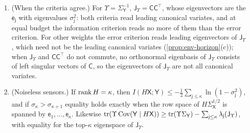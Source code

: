 \begin{theorem}
\begin{enumerate}
\item[(d)] (When the criteria agree.) For $\Upsilon=\Sigma_{\mathsf Y}^{-1}$, $\mathsf J_\Upsilon=\mathsf C\mathsf C^\top$, whose eigenvectors are the $\mathsf e_{\mathsf j}$ with eigenvalues $\sigma_{\mathsf j}^2$: both criteria read leading canonical variates, and at equal budget the information criterion reads no more of them than the error criterion. For other weights the error criterion reads leading eigenvectors of $\mathsf J_\Upsilon$, which need not be the leading canonical variates (\cref{prop:env-horizon}(c)); when $\mathsf J_\Upsilon$ and $\mathsf C\mathsf C^\top$ do not commute, no orthonormal eigenbasis of $\mathsf J_\Upsilon$ consists of left singular vectors of $\mathsf C$, so the eigenvectors of $\mathsf J_\Upsilon$ are not all canonical variates.
\item[(e)] (Noiseless sensors.) If $\operatorname{rank} H=\kappa$, then $I(H\mathsf X;\mathsf Y)\le-\frac12\sum_{\mathsf j\le\kappa}\ln(1-\sigma_{\mathsf j}^2)$, and if $\sigma_\kappa>\sigma_{\kappa+1}$ equality holds exactly when the row space of $H\Sigma_{\mathsf X}^{1/2}$ is spanned by $\mathsf e_1,\dots,\mathsf e_\kappa$. Likewise $\operatorname{tr}(\Upsilon\operatorname{Cov}(\mathsf Y\mid H\mathsf X))\ge\operatorname{tr}(\Upsilon\Sigma_{\mathsf Y})-\sum_{\mathsf j\le\kappa}\lambda_{\mathsf j}(\mathsf J_\Upsilon)$, with equality for the top-$\kappa$ eigenspace of $\mathsf J_\Upsilon$.
\end{enumerate}
\end{theorem}

